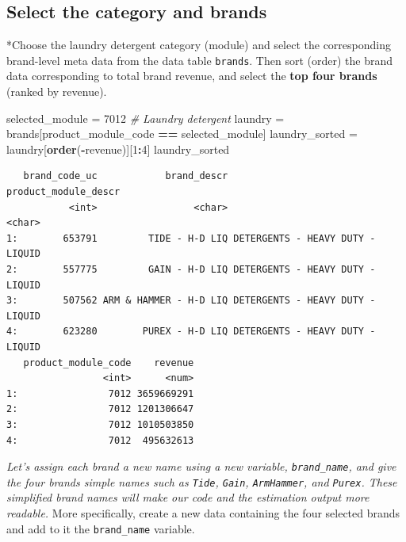 \documentclass[
]{article}
\newenvironment{Shaded}{\begin{snugshade}}{\end{snugshade}}
\newcommand{\CommentTok}[1]{\textcolor[rgb]{0.56,0.35,0.01}{\textit{#1}}}
\newcommand{\DecValTok}[1]{\textcolor[rgb]{0.00,0.00,0.81}{#1}}
\newcommand{\FunctionTok}[1]{\textcolor[rgb]{0.13,0.29,0.53}{\textbf{#1}}}
\newcommand{\NormalTok}[1]{#1}
\newcommand{\OtherTok}[1]{\textcolor[rgb]{0.56,0.35,0.01}{#1}}
\newcommand{\SpecialCharTok}[1]{\textcolor[rgb]{0.81,0.36,0.00}{\textbf{#1}}}
\begin{document}
\subsection{Select the category and
brands}\label{select-the-category-and-brands}

*Choose the laundry detergent category (module) and select the
corresponding brand-level meta data from the data table \texttt{brands}.
Then sort (order) the brand data corresponding to total brand revenue,
and select the \textbf{top four brands} (ranked by revenue).

\begin{Shaded}
\begin{Highlighting}[]
\NormalTok{selected\_module }\OtherTok{=} \DecValTok{7012}                 \CommentTok{\# Laundry detergent}
\NormalTok{laundry }\OtherTok{=}\NormalTok{ brands[product\_module\_code }\SpecialCharTok{==}\NormalTok{ selected\_module]}
\NormalTok{laundry\_sorted }\OtherTok{=}\NormalTok{ laundry[}\FunctionTok{order}\NormalTok{(}\SpecialCharTok{{-}}\NormalTok{revenue)][}\DecValTok{1}\SpecialCharTok{:}\DecValTok{4}\NormalTok{]}
\NormalTok{laundry\_sorted}
\end{Highlighting}
\end{Shaded}

\begin{verbatim}
   brand_code_uc            brand_descr             product_module_descr
           <int>                 <char>                           <char>
1:        653791         TIDE - H-D LIQ DETERGENTS - HEAVY DUTY - LIQUID
2:        557775         GAIN - H-D LIQ DETERGENTS - HEAVY DUTY - LIQUID
3:        507562 ARM & HAMMER - H-D LIQ DETERGENTS - HEAVY DUTY - LIQUID
4:        623280        PUREX - H-D LIQ DETERGENTS - HEAVY DUTY - LIQUID
   product_module_code    revenue
                 <int>      <num>
1:                7012 3659669291
2:                7012 1201306647
3:                7012 1010503850
4:                7012  495632613
\end{verbatim}

\medskip

\emph{Let's assign each brand a new name using a new variable,
\texttt{brand\_name}, and give the four brands simple names such as
\texttt{Tide}, \texttt{Gain}, \texttt{ArmHammer}, and \texttt{Purex}.
These simplified brand names will make our code and the estimation
output more readable.} More specifically, create a new data containing
the four selected brands and add to it the \texttt{brand\_name}
variable.
\end{document}
